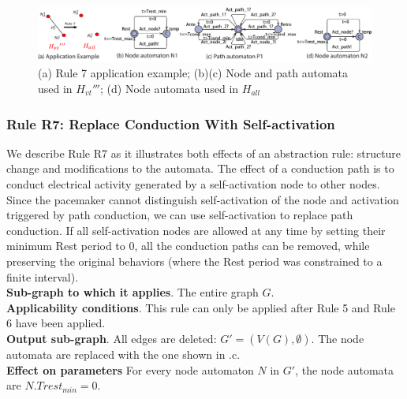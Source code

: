 \begin{figure}[!t]
	\centering
	\includegraphics[width=1.05\textwidth]{figs/rule5.pdf}
	\caption{\small (a) Rule 7 application example; (b)(c) Node and path automata used in $H_{vt}'''$; (d) Node automata used in $H_{all}$ }
	\vspace{-15pt}
	\label{fig:rule5}
\end{figure}

\subsubsection{Rule R7: Replace Conduction With Self-activation}
We describe Rule R7 as it illustrates both effects of an abstraction rule: structure change and modifications to the automata.
The effect of a conduction path is to conduct electrical activity generated by a self-activation node to other nodes. Since the pacemaker cannot distinguish self-activation of the node and activation triggered by path conduction, we can use self-activation to replace path conduction.
If all self-activation nodes are allowed at any time by setting their minimum Rest period to 0, all the conduction paths can be removed, while preserving the original behaviors (where the Rest period was constrained to a finite interval).\\
\textbf{Sub-graph to which it applies}.
The entire graph $G$.\\
\textbf{Applicability conditions}.
This rule can only be applied after Rule 5 and Rule 6 have been applied.\\
\textbf{Output sub-graph}.
All edges are deleted: $G' = (V(G), \emptyset)$. The node automata are replaced with the one shown in .c.\\
\textbf{Effect on parameters}
For every node automaton $N$ in $G'$, the node automata are $N.Trest_{min}=0$.\\

